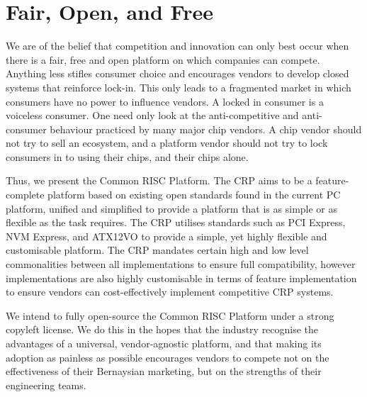 \documentclass[12pt]{report}
\begin{document}
\section{Fair, Open, and Free}
We are of the belief that competition and innovation can only best occur when there is a fair, free and open platform
on which companies can compete. Anything less stifles consumer choice and encourages vendors to develop closed systems
that reinforce lock-in. This only leads to a fragmented market in which consumers have no power to influence vendors.
A locked in consumer is a voiceless consumer. One need only look at the anti-competitive and anti-consumer behaviour
practiced by many major chip vendors. A chip vendor should not try to sell an ecosystem, and a platform vendor should
not try to lock consumers in to using their chips, and their chips alone.

Thus, we present the Common RISC Platform. The CRP aims to be a feature-complete platform based on existing
open standards found in the current PC platform, unified and simplified to provide a platform that is as simple or as
flexible as the task requires. The CRP utilises standards such as PCI Express, NVM Express, and ATX12VO to provide a
simple, yet highly flexible and customisable platform. The CRP mandates certain high and low level commonalities
between all implementations to ensure full compatibility, however implementations are also highly customisable in terms
of feature implementation to ensure vendors can cost-effectively implement competitive CRP systems.

We intend to fully open-source the Common RISC Platform under a strong copyleft license. We do this in the hopes
that the industry recognise the advantages of a universal, vendor-agnostic platform, and that making its adoption as
painless as possible encourages vendors to compete not on the effectiveness of their Bernaysian marketing, but on
the strengths of their engineering teams.

\newpage
\end{document}
